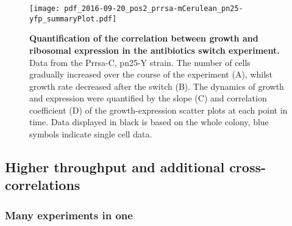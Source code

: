 \begin{figure}
    \begin{minipage}[c]{0.7\textwidth}
        \texttt{[image: pdf\_2016-09-20\_pos2\_prrsa-mCerulean\_pn25-yfp\_summaryPlot.pdf]}
    \end{minipage}\hfill
    \begin{minipage}[c]{0.3\textwidth}
        \caption{ 
            \textbf{Quantification of the correlation between growth and ribosomal expression in the antibiotics switch experiment.}
            Data from the Prrsa-C, pn25-Y strain. The number of cells gradually increased over the course of the experiment (A), whilst growth rate decreased after the switch (B).
            The dynamics of growth and expression were quantified by the slope (C) and correlation coefficient (D) of the growth-expression scatter plots at each point in time.
            Data displayed in black is based on the whole colony, blue symbols indicate single cell data.
        }
        \label{fig:ribo:switch5}
    \end{minipage}
\end{figure}



\subsection{Higher throughput and additional cross-correlations}

\subsubsection{Many experiments in one}

